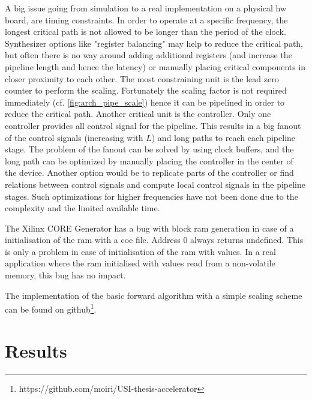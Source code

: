 \documentclass[mscthesis]{usiinfthesis}
\begin{document}
A big issue going from simulation to a real implementation on a physical
\gls{hw} board, are timing constraints. In order to operate at a specific
frequency, the longest critical path is not allowed to be longer than the
period of the clock. Synthesizer options like "register balancing" may help to
reduce the critical path, but often there is no way around adding additional
registers (and increase the pipeline length and hence the latency) or manually
placing critical components in closer proximity to each other. The most
constraining unit is the lead zero counter to perform the scaling. Fortunately
the scaling factor is not required immediately (cf. \ref{fig:arch_pipe_scale})
hence it can be pipelined in order to reduce the critical path. Another critical
unit is the controller. Only one controller provides all control signal for the
pipeline. This results in a big fanout of the control signals (increasing with
$L$) and long paths to reach each pipeline stage. The problem of the fanout can
be solved by using clock buffers, and the long path can be optimized by manually
placing the controller in the center of the device. Another option would be to
replicate parts of the controller or find relations between control signals and
compute local control signals in the pipeline stages.  Such optimizations for
higher frequencies have not been done due to the complexity and the limited
available time.

The Xilinx CORE Generator has a bug with block \gls{ram} generation in case
of a initialisation of the \gls{ram} with a coe file. Address 0 always returns
undefined. This is only a problem in case of initialisation of the \gls{ram}
with values. In a real application where the \gls{ram} initialised with values
read from a non-volatile memory, this bug has no impact.

The implementation of the basic forward algorithm with a simple scaling scheme
can be found on
github\footnote{https://github.com/moiri/USI-thesis-accelerator}.

\chapter{Results}
\label{ch:results}
\glsresetall %
\end{document}
